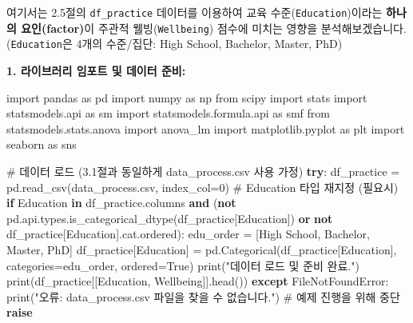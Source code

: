 \documentclass[
  letterpaper,
]{book}
\newenvironment{Shaded}{\begin{snugshade}}{\end{snugshade}}
\newcommand{\BuiltInTok}[1]{\textcolor[rgb]{0.00,0.23,0.31}{#1}}
\newcommand{\CommentTok}[1]{\textcolor[rgb]{0.37,0.37,0.37}{#1}}
\newcommand{\ControlFlowTok}[1]{\textcolor[rgb]{0.00,0.23,0.31}{\textbf{#1}}}
\newcommand{\DecValTok}[1]{\textcolor[rgb]{0.68,0.00,0.00}{#1}}
\newcommand{\ImportTok}[1]{\textcolor[rgb]{0.00,0.46,0.62}{#1}}
\newcommand{\KeywordTok}[1]{\textcolor[rgb]{0.00,0.23,0.31}{\textbf{#1}}}
\newcommand{\NormalTok}[1]{\textcolor[rgb]{0.00,0.23,0.31}{#1}}
\newcommand{\OperatorTok}[1]{\textcolor[rgb]{0.37,0.37,0.37}{#1}}
\newcommand{\PreprocessorTok}[1]{\textcolor[rgb]{0.68,0.00,0.00}{#1}}
\newcommand{\StringTok}[1]{\textcolor[rgb]{0.13,0.47,0.30}{#1}}
\newcommand{\VariableTok}[1]{\textcolor[rgb]{0.07,0.07,0.07}{#1}}
\begin{document}
여기서는 2.5절의 \texttt{df\_practice} 데이터를 이용하여 교육
수준(\texttt{Education})이라는 \textbf{하나의 요인(factor)}이 주관적
웰빙(\texttt{Wellbeing}) 점수에 미치는 영향을 분석해보겠습니다.
(\texttt{Education}은 4개의 수준/집단: High School, Bachelor, Master,
PhD)

\textbf{1. 라이브러리 임포트 및 데이터 준비:}

\begin{Shaded}
\begin{Highlighting}[]
\ImportTok{import}\NormalTok{ pandas }\ImportTok{as}\NormalTok{ pd}
\ImportTok{import}\NormalTok{ numpy }\ImportTok{as}\NormalTok{ np}
\ImportTok{from}\NormalTok{ scipy }\ImportTok{import}\NormalTok{ stats}
\ImportTok{import}\NormalTok{ statsmodels.api }\ImportTok{as}\NormalTok{ sm}
\ImportTok{import}\NormalTok{ statsmodels.formula.api }\ImportTok{as}\NormalTok{ smf}
\ImportTok{from}\NormalTok{ statsmodels.stats.anova }\ImportTok{import}\NormalTok{ anova\_lm}
\ImportTok{import}\NormalTok{ matplotlib.pyplot }\ImportTok{as}\NormalTok{ plt}
\ImportTok{import}\NormalTok{ seaborn }\ImportTok{as}\NormalTok{ sns}

\CommentTok{\# 데이터 로드 (3.1절과 동일하게 data\_process.csv 사용 가정)}
\ControlFlowTok{try}\NormalTok{:}
\NormalTok{    df\_practice }\OperatorTok{=}\NormalTok{ pd.read\_csv(}\StringTok{\textquotesingle{}data\_process.csv\textquotesingle{}}\NormalTok{, index\_col}\OperatorTok{=}\DecValTok{0}\NormalTok{)}
    \CommentTok{\# Education 타입 재지정 (필요시)}
    \ControlFlowTok{if} \StringTok{\textquotesingle{}Education\textquotesingle{}} \KeywordTok{in}\NormalTok{ df\_practice.columns }\KeywordTok{and}\NormalTok{ (}\KeywordTok{not}\NormalTok{ pd.api.types.is\_categorical\_dtype(df\_practice[}\StringTok{\textquotesingle{}Education\textquotesingle{}}\NormalTok{]) }\KeywordTok{or} \KeywordTok{not}\NormalTok{ df\_practice[}\StringTok{\textquotesingle{}Education\textquotesingle{}}\NormalTok{].cat.ordered):}
\NormalTok{         edu\_order }\OperatorTok{=}\NormalTok{ [}\StringTok{\textquotesingle{}High School\textquotesingle{}}\NormalTok{, }\StringTok{\textquotesingle{}Bachelor\textquotesingle{}}\NormalTok{, }\StringTok{\textquotesingle{}Master\textquotesingle{}}\NormalTok{, }\StringTok{\textquotesingle{}PhD\textquotesingle{}}\NormalTok{]}
\NormalTok{         df\_practice[}\StringTok{\textquotesingle{}Education\textquotesingle{}}\NormalTok{] }\OperatorTok{=}\NormalTok{ pd.Categorical(df\_practice[}\StringTok{\textquotesingle{}Education\textquotesingle{}}\NormalTok{], categories}\OperatorTok{=}\NormalTok{edu\_order, ordered}\OperatorTok{=}\VariableTok{True}\NormalTok{)}
    \BuiltInTok{print}\NormalTok{(}\StringTok{"데이터 로드 및 준비 완료."}\NormalTok{)}
    \BuiltInTok{print}\NormalTok{(df\_practice[[}\StringTok{\textquotesingle{}Education\textquotesingle{}}\NormalTok{, }\StringTok{\textquotesingle{}Wellbeing\textquotesingle{}}\NormalTok{]].head())}
\ControlFlowTok{except} \PreprocessorTok{FileNotFoundError}\NormalTok{:}
    \BuiltInTok{print}\NormalTok{(}\StringTok{"오류: \textquotesingle{}data\_process.csv\textquotesingle{} 파일을 찾을 수 없습니다."}\NormalTok{)}
    \CommentTok{\# 예제 진행을 위해 중단}
    \ControlFlowTok{raise}
\end{Highlighting}
\end{Shaded}
\end{document}
